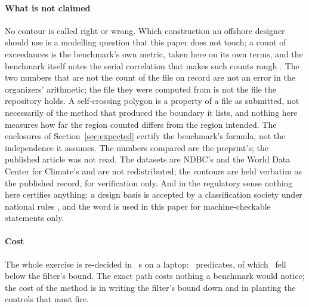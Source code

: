 \documentclass[preprint,11pt,authoryear]{elsarticle}
\begin{document}
\paragraph{What is not claimed}
No contour is called right or wrong. Which construction an offshore designer should use is a modelling question that this paper does not touch; a count of exceedances is the benchmark's own metric, taken here on its own terms, and the benchmark itself notes the serial correlation that makes such counts rough \citep{haselsteiner2021}. The two numbers that are not the count of the file on record are not an error in the organizers' arithmetic; the file they were computed from is not the file the repository holds. A self-crossing polygon is a property of a file as submitted, not necessarily of the method that produced the boundary it lists, and nothing here measures how far the region counted differs from the region intended. The enclosures of Section~\ref{sec:expected} certify the benchmark's formula, not the independence it assumes. The numbers compared are the preprint's; the published article was not read. The datasets are NDBC's and the World Data Center for Climate's and are not redistributed; the contours are held verbatim as the published record, for verification only. And in the regulatory sense nothing here certifies anything: a design basis is accepted by a classification society under national rules \citep{dnv2021,iso19901}, and the word is used in this paper for machine-checkable statements only.

\paragraph{Cost}
The whole exercise is re-decided in \ESeconds\ s on a laptop: \EPredicatesSci\ predicates, of which \EExactPredicates\ fell below the filter's bound. The exact path costs nothing a benchmark would notice; the cost of the method is in writing the filter's bound down and in planting the controls that must fire.
\end{document}
